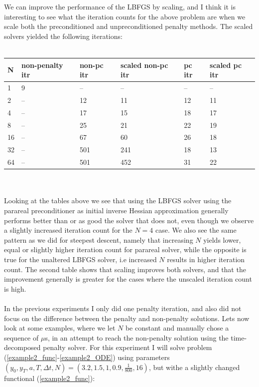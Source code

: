 \documentclass[11pt,a4paper]{article}
\begin{document}
\\
\\
We can improve the performance of the LBFGS by scaling, and I think it is interesting to see what the iteration counts for the above problem are when we scale both the preconditioned and unpreconditioned penalty methods. The scaled solvers yielded the following iterations:
\\
\\
\begin{tabular}{llllll}
\toprule
{} N & non-penalty itr & non-pc itr & scaled non-pc itr & pc itr & scaled pc itr \\
\midrule
1  &               9 &         -- &                -- &     -- &            -- \\
2  &              -- &         12 &                11 &     12 &            11 \\
4  &              -- &         17 &                15 &     18 &            17 \\
8  &              -- &         25 &                21 &     22 &            19 \\
16 &              -- &         67 &                60 &     26 &            18 \\
32 &              -- &        501 &               241 &     18 &            13 \\
64 &              -- &        501 &               452 &     31 &            22 \\
\bottomrule
\end{tabular}  
\\
\\
Looking at the tables above we see that using the LBFGS solver using the parareal preconditioner as initial inverse Hessian approximation generally performs better than or as good the solver that does not, even though we observe a slightly increased iteration count for the $N=4$ case. We also see the same pattern as we did for steepest descent, namely that increasing $N$ yields lower, equal or slightly higher iteration count for parareal solver, while the opposite is true for the unaltered LBFGS solver, i.e increased $N$ results in higher iteration count. The second table shows that scaling improves both solvers, and that the improvement generally is greater for the cases where the unscaled iteration count is high.
\\
\\
In the previous experiments I only did one penalty iteration, and also did not focus on the difference between the penalty and non-penalty solutions. Lets now look at some examples, where we let $N$ be constant and manually chose a sequence of $\mu$s, in an attempt to reach the non-penalty solution using the time-decomposed penalty solver. For this experiment I will solve problem (\ref{example2_func}-\ref{example2_ODE}) using parameters $(y_0,y_T,a,T,\Delta t,N)=(3.2,1.5,1,0.9,\frac{1}{800},16)$, but withe a slightly changed functional (\ref{example2_func}):
\end{document}
